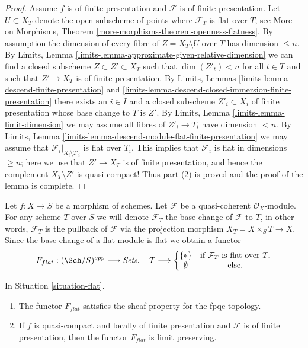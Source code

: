 \begin{proof}
\medskip\noindent
Assume $f$ is of finite presentation and $\mathcal{F}$ is of finite
presentation. Let $U \subset X_T$ denote the open subscheme of points where
$\mathcal{F}_T$ is flat over $T$, see
More on Morphisms, Theorem \ref{more-morphisms-theorem-openness-flatness}.
By assumption the dimension of every fibre of $Z = X_T \setminus U$ over
$T$ has dimension $\leq n$. By
Limits, Lemma \ref{limits-lemma-approximate-given-relative-dimension}
we can find a closed subscheme $Z \subset Z' \subset X_T$
such that $\dim(Z'_t) < n$ for all $t \in T$ and such that
$Z' \to X_T$ is of finite presentation. By
Limits, Lemmas \ref{limits-lemma-descend-finite-presentation} and
\ref{limits-lemma-descend-closed-immersion-finite-presentation}
there exists an $i \in I$ and a closed subscheme $Z'_i \subset X_i$
of finite presentation whose base change to $T$ is $Z'$. By
Limits, Lemma \ref{limits-lemma-limit-dimension}
we may assume all fibres of $Z'_i \to T_i$ have dimension $< n$. By
Limits, Lemma \ref{limits-lemma-descend-module-flat-finite-presentation}
we may assume that $\mathcal{F}_i|_{X_i \setminus T'_i}$
is flat over $T_i$. This implies that $\mathcal{F}_i$ is
flat in dimensions $\geq n$; here we use that $Z' \to X_T$ is of finite
presentation, and hence the complement $X_T \setminus Z'$ is quasi-compact!
Thus part (2) is proved and the proof of the lemma is complete.
\end{proof}

\begin{situation}
\label{situation-flat}
Let $f : X \to S$ be a morphism of schemes.
Let $\mathcal{F}$ be a quasi-coherent $\mathcal{O}_X$-module.
For any scheme $T$ over $S$ we will denote $\mathcal{F}_T$ the
base change of $\mathcal{F}$ to $T$, in other words, $\mathcal{F}_T$
is the pullback of $\mathcal{F}$ via the projection morphism
$X_T = X \times_S T \to X$. Since the base change of a flat module
is flat we obtain a functor
\begin{equation}
\label{equation-flat}
F_{flat} : (\Sch/S)^{opp} \longrightarrow \textit{Sets}, \quad
T \longrightarrow \left\{
\begin{matrix}
\{*\} & \text{if } \mathcal{F}_T \text{ is flat over }T, \\
\emptyset & \text{else.}
\end{matrix}
\right.
\end{equation}
\end{situation}

\begin{lemma}
\label{lemma-flat}
In Situation \ref{situation-flat}.
\begin{enumerate}
\item The functor $F_{flat}$ satisfies the sheaf property for the fpqc topology.
\item If $f$ is quasi-compact and locally of finite presentation
and $\mathcal{F}$ is of finite presentation, then the functor
$F_{flat}$ is limit preserving.
\end{enumerate}
\end{lemma}

